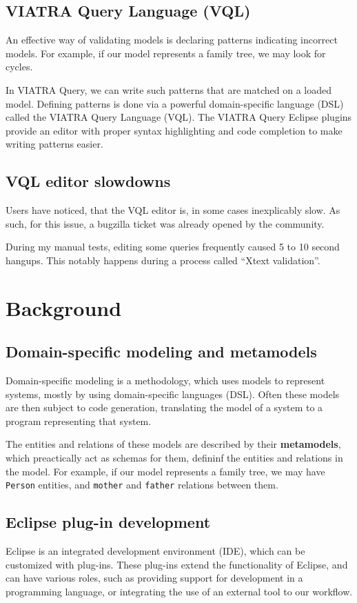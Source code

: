 \documentclass[11pt,a4paper,oneside]{report}
\begin{document}
\section{VIATRA Query Language (VQL)}
An effective way of validating models is declaring patterns indicating incorrect
models. For example, if our model represents a family tree, we may look for
cycles.

In VIATRA Query, we can write such patterns that are matched on a loaded model.
Defining patterns is done via a powerful domain-specific language (DSL) called
the VIATRA Query Language (VQL). The VIATRA Query Eclipse plugins provide an
editor with proper syntax highlighting and code completion to make writing
patterns easier.

\section{VQL editor slowdowns}
Users have noticed, that the VQL editor is, in some cases inexplicably slow.
As such, for this issue, a bugzilla ticket was already opened by the
community\cite{bugzilla-ticket}.

During my manual tests, editing some queries frequently caused 5 to 10 second
hangups. This notably happens during a process called ``Xtext validation''.

\chapter{Background}

\section{Domain-specific modeling and metamodels}
Domain-specific modeling is a methodology, which uses models to represent
systems, mostly by using domain-specific languages (DSL). Often these models
are then subject to code generation, translating the model of a system to a
program representing that system.

The entities and relations of these models are described by their
\textbf{metamodels}, which preactically act as schemas for them, defininf the
entities and relations in the model. For example, if our model represents a
family tree, we may have \texttt{Person} entities, and \texttt{mother} and
\texttt{father} relations between them.

\section{Eclipse plug-in development}
Eclipse is an integrated development environment (IDE), which can be customized
with plug-ins. These plug-ins extend the functionality of Eclipse, and can have
various roles, such as providing support for development in a programming
language, or integrating the use of an external tool to our workflow.
\end{document}
